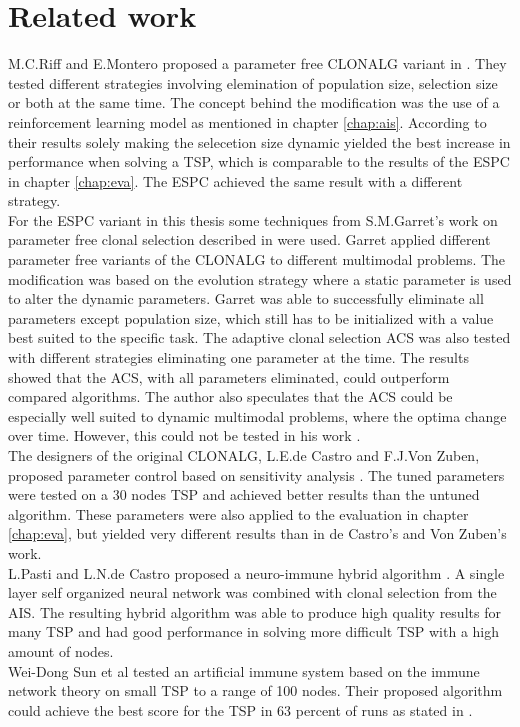 \chapter{Related work}
\label{chap:rlw}
M.C.Riff and E.Montero proposed a parameter free CLONALG variant in \cite{RIFF09}. They tested different strategies involving elemination of population size, selection size or both at the same time. The concept behind the modification was the use of a reinforcement learning model as mentioned in chapter \ref{chap:ais}. According to their results solely making the selecetion size dynamic yielded the best increase in performance when solving a TSP, which is comparable to the results of the ESPC in chapter \ref{chap:eva}. The ESPC achieved the same result with a different strategy.\\
For the ESPC variant in this thesis some techniques from S.M.Garret's work on parameter free clonal selection described in \cite{Garret04} were used. Garret applied different parameter free variants of the CLONALG to different multimodal problems. The modification was based on the evolution strategy where a static parameter is used to alter the dynamic parameters. Garret was able to successfully eliminate all parameters except population size, which still has to be initialized with a value best suited to the specific task. The adaptive clonal selection ACS was also tested with different strategies eliminating one parameter at the time. The results showed that the ACS, with all parameters eliminated, could outperform compared algorithms. The author also speculates that the ACS could be especially well suited to dynamic multimodal problems, where the optima change over time. However, this could not be tested in his work \cite{Garret04}.\\
The designers of the original CLONALG, L.E.de Castro and F.J.Von Zuben, proposed parameter control based on sensitivity analysis \cite{DEC02}. The tuned parameters were tested on a 30 nodes TSP and achieved better results than the untuned algorithm. These parameters were also applied to the evaluation in chapter \ref{chap:eva}, but yielded very different results than in de Castro's and Von Zuben's work.\\
L.Pasti and L.N.de Castro proposed a neuro-immune hybrid algorithm \cite{Pasti06}. A single layer self organized neural network was combined with clonal selection from the AIS. The resulting hybrid algorithm was able to produce high quality results for many TSP and had good performance in solving more difficult TSP with a high amount of nodes.\\
Wei-Dong Sun et al tested an artificial immune system based on the immune network theory on small TSP to a range of 100 nodes. Their proposed algorithm could achieve the best score for the TSP in 63 percent of runs as stated in \cite{sun}. 